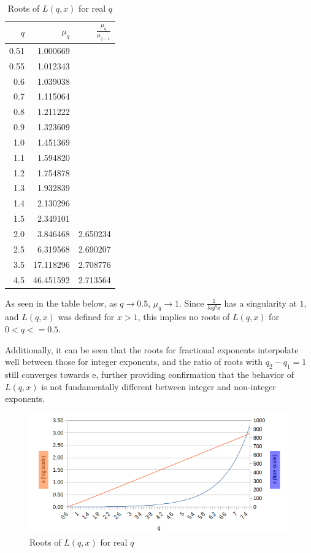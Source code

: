 \documentclass[a4paper,11pt,twoside]{amsart}
\newcommand\e{\mathrm{e}}
\begin{document}
\begin{table}[H]
    \begin{tabular}{r|r|r} %
      $q$ & $\mu_{q}$ & $\frac{\mu_{q}}{\mu_{q-1}}$\\
      \hline
      0.51 & 1.000669 & \\
      0.55 & 1.012343 & \\
      0.6 & 1.039038 & \\
      0.7 & 1.115064 & \\
      0.8 & 1.211222 & \\
      0.9 & 1.323609 & \\
      1.0 & 1.451369 & \\
      1.1 & 1.594820 & \\
      1.2 & 1.754878 & \\
      1.3 & 1.932839 & \\
      1.4 & 2.130296 & \\
      1.5 & 2.349101 & \\
      2.0 & 3.846468 & 2.650234\\
      2.5 & 6.319568 & 2.690207\\
      3.5 & 17.118296 & 2.708776\\
      4.5 & 46.451592 & 2.713564\\
    \end{tabular}
    \caption{Roots of $L(q,x)$ for real $q$}
\end{table}
\vspace{-2em}
As seen in the table below, as $q \to 0.5$, $\mu_{q} \to 1$. Since $\frac{1}{log^{q} x}$ has a singularity at $1$, and $L(q,x)$ was defined for $x>1$, this implies no roots of $L(q,x)$ for $0<q<=0.5$.

Additionally, it can be seen that the roots for fractional exponents interpolate well between those for integer exponents, and the ratio of roots with $q_2 - q_1 = 1$ still converges towards $\e$, further providing confirmation that the behavior of $L(q,x)$ is not fundamentally different between integer and non-integer exponents.

\begin{figure}[H]
  \includegraphics[width=0.5\linewidth]{logpowrealroots.png}
  \caption{Roots of $L(q,x)$ for real $q$}
\end{figure}
\end{document}
